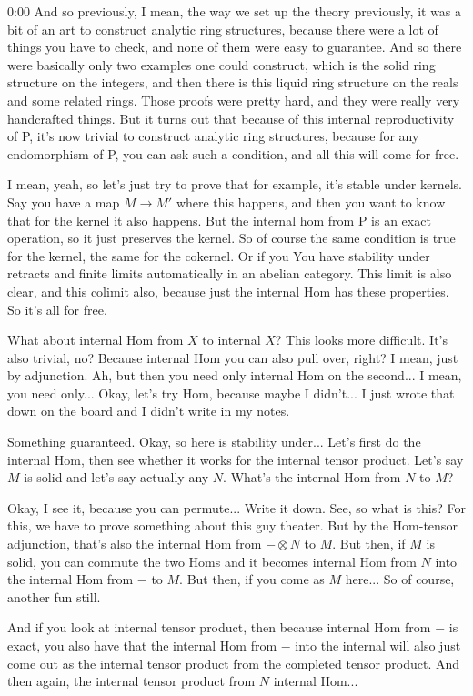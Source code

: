 \begin{unfinished}{0:00}
And so previously, I mean, the way we set up the theory previously, it was a bit of an art to construct analytic ring structures, because there were a lot of things you have to check, and none of them were easy to guarantee. And so there were basically only two examples one could construct, which is the solid ring structure on the integers, and then there is this liquid ring structure on the reals and some related rings. Those proofs were pretty hard, and they were really very handcrafted things. But it turns out that because of this internal reproductivity of P, it's now trivial to construct analytic ring structures, because for any endomorphism of P, you can ask such a condition, and all this will come for free.

I mean, yeah, so let's just try to prove that for example, it's stable under kernels. Say you have a map $M \to M'$ where this happens, and then you want to know that for the kernel it also happens. But the internal hom from P is an exact operation, so it just preserves the kernel. So of course the same condition is true for the kernel, the same for the cokernel. Or if you
You have stability under retracts and finite limits automatically in an abelian category. This limit is also clear, and this colimit also, because just the internal Hom has these properties. So it's all for free.

What about internal Hom from $X$ to internal $X$? This looks more difficult. It's also trivial, no? Because internal Hom you can also pull over, right? I mean, just by adjunction. Ah, but then you need only internal Hom on the second... I mean, you need only... Okay, let's try Hom, because maybe I didn't... I just wrote that down on the board and I didn't write in my notes.

Something guaranteed. Okay, so here is stability under... Let's first do the internal Hom, then see whether it works for the internal tensor product. Let's say $M$ is solid and let's say actually any $N$. What's the internal Hom from $N$ to $M$?

Okay, I see it, because you can permute... Write it down. See, so what is this? For this, we have to prove something about this guy theater. But by the Hom-tensor adjunction, that's also the internal Hom from $- \otimes N$ to $M$. But then, if $M$ is solid, you can commute the two Homs and it becomes internal Hom from $N$ into the internal Hom from $-$ to $M$. But then, if you come as $M$ here... So of course, another fun still.

And if you look at internal tensor product, then because internal Hom from $-$ is exact, you also have that the internal Hom from $-$ into the internal will also just come out as the internal tensor product from the completed tensor product. And then again, the internal tensor product from $N$ internal Hom...


\end{unfinished}
